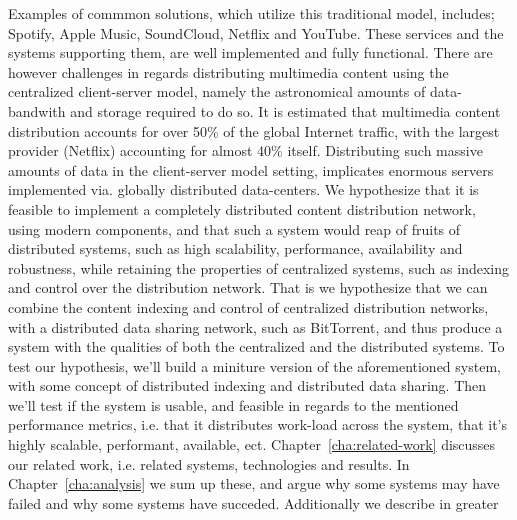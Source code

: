 Examples of commmon solutions, which utilize this traditional model, includes;
Spotify, Apple Music, SoundCloud, Netflix and YouTube.
\newline
These services and the systems supporting them, are well implemented and
fully functional. There are however challenges in regards distributing
multimedia content using the centralized client-server model, namely the 
astronomical amounts of data-bandwith and storage required to do so.
\newline
It is estimated that multimedia content distribution accounts for over 50\% of
the global Internet traffic, with the largest provider (Netflix) accounting for
almost 40\% itself\citep{sandvine:2015}.
\newline
Distributing such massive amounts of data in the client-server model setting, 
implicates enormous servers implemented via. globally distributed data-centers.
\newline\newline
We hypothesize that it is feasible to implement a completely distributed
content distribution network, using modern components, and that such a system
would reap of fruits of distributed systems, such as high scalability, 
performance, availability and robustness, while retaining the properties of 
centralized systems, such as indexing and control over the distribution network.
\newline
That is we hypothesize that we can combine the content indexing and control of
centralized distribution networks, with a distributed data sharing network,
such as BitTorrent, and thus produce a system with the qualities of both the
centralized and the distributed systems.
\newline\newline
To test our hypothesis, we'll build a miniture version of the aforementioned
system, with some concept of distributed indexing and distributed data
sharing.
\newline
Then we'll test if the system is usable, and feasible in regards to the
mentioned performance metrics, i.e. that it distributes work-load across the
system, that it's highly scalable, performant, available, ect.
\newline\newline
Chapter~\ref{cha:related-work} discusses our related work, i.e. related systems,
technologies and results.
In Chapter~\ref{cha:analysis} we sum up these, and argue why some systems may have
failed and why some systems have succeded. Additionally we describe in greater
